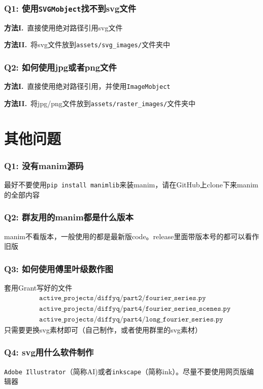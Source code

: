 \documentclass[UTF8]{ctexart}
\begin{document}
\subsubsection*{Q1: 使用\texttt{SVGMobject}找不到svg文件}
\textbf{方法I.}\ 直接使用绝对路径引用svg文件

\textbf{方法II.}\ 将svg文件放到\texttt{assets/svg\_images/}文件夹中

\subsubsection*{Q2: 如何使用jpg或者png文件}
\textbf{方法I.}\ 直接使用绝对路径引用，并使用\texttt{ImageMobject}

\textbf{方法II.}\ 将jpg/png文件放到\texttt{assets/raster\_images/}文件夹中

\section{其他问题}
\subsubsection*{Q1: 没有manim源码}
最好不要使用\texttt{pip install manimlib}来装manim，请在GitHub上clone下来manim的全部内容

\subsubsection*{Q2: 群友用的manim都是什么版本}
manim不看版本，一般使用的都是最新版code。release里面带版本号的都可以看作旧版

\subsubsection*{Q3: 如何使用傅里叶级数作图}
套用Grant写好的文件
\begin{align*}
&\texttt{active\_projects/diffyq/part2/fourier\_series.py}\\
&\texttt{active\_projects/diffyq/part4/fourier\_series\_scenes.py}\\
&\texttt{active\_projects/diffyq/part4/long\_fourier\_series.py}
\end{align*}
只需要更换svg素材即可（自己制作，或者使用群里的svg素材）

\subsubsection*{Q4: svg用什么软件制作}
\texttt{Adobe Illustrator}（简称AI)或者\texttt{inkscape}（简称ink）。尽量不要使用网页版编辑器
\end{document}
